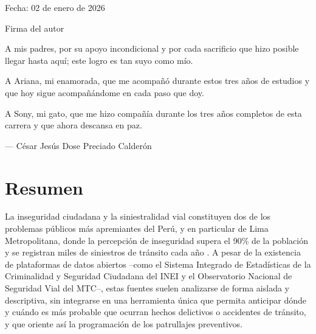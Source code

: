 \documentclass[12pt,letterpaper]{report}
\begin{document}
\vspace{1cm}
\noindent Fecha: 02 de enero de 2026

\vspace{1.5cm}
\noindent Firma del autor

\newpage

\thispagestyle{empty}
\vspace*{3.5cm}
\begin{center}
\itshape

A mis padres, por su apoyo incondicional y por cada sacrificio que hizo
posible llegar hasta aquí; este logro es tan suyo como mío.

\bigskip

A Ariana, mi enamorada, que me acompañó durante estos tres años de
estudios y que hoy sigue acompañándome en cada paso que doy.

\bigskip

A Sony, mi gato, que me hizo compañía durante los tres años completos de
esta carrera y que ahora descansa en paz.

\bigskip

--- César Jesús Dose Preciado Calderón

\end{center}
\newpage

\tableofcontents
\newpage
\listoftables
\listoffigures
\newpage

\chapter*{Resumen}

La inseguridad ciudadana y la siniestralidad vial constituyen dos de los problemas p\'ublicos m\'as apremiantes del Per\'u, y en particular de Lima Metropolitana, donde la percepci\'on de inseguridad supera el 90\% de la poblaci\'on y se registran miles de siniestros de tr\'ansito cada a\~no \citep{inei2022sistema,mtc2024observatorio}. A pesar de la existencia de plataformas de datos abiertos --como el Sistema Integrado de Estad\'isticas de la Criminalidad y Seguridad Ciudadana del INEI y el Observatorio Nacional de Seguridad Vial del MTC--, estas fuentes suelen analizarse de forma aislada y descriptiva, sin integrarse en una herramienta \'unica que permita anticipar d\'onde y cu\'ando es m\'as probable que ocurran hechos delictivos o accidentes de tr\'ansito, y que oriente as\'i la programaci\'on de los patrullajes preventivos.
\end{document}
